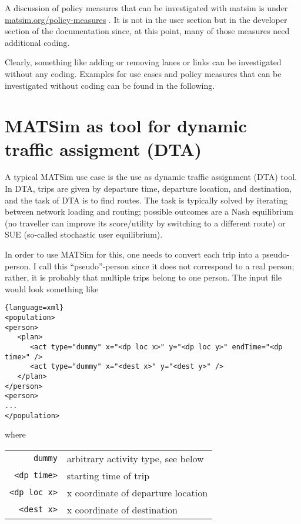 
A discussion of policy measures that can be investigated with matsim is under \href{http://matsim.org/policy-measures}{matsim.org/policy-measures}  . It is not in the user section but in the developer section of  the documentation since, at this point, many of those measures need additional coding. 

Clearly, something like adding or removing lanes or  links can be investigated without any coding.  Examples for use cases and policy measures that can be investigated without coding can be found in the following.

\section{MATSim as tool for dynamic traffic assigment (DTA)}


A typical MATSim use case is the use as dynamic traffic assignment (DTA) tool.  In DTA, trips are given by departure time, departure location, and destination, and the task of DTA is to find routes.  The task is typically solved by iterating between network loading and routing; possible outcomes are a Nash equilibrium (no traveller can improve its score/utility by switching to a different route) or SUE (so-called stochastic user equilibrium).

In order to use MATSim for this, one needs to convert each trip into a pseudo-person.  I call this ``pseudo''-person since it does not correspond to a real person; rather, it is probably that multiple trips belong to one person.  The input file would look something like
\begin{lstlisting}{language=xml}
<population>
<person>
   <plan>
      <act type="dummy" x="<dp loc x>" y="<dp loc y>" endTime="<dp time>" />
      <act type="dummy" x="<dest x>" y="<dest y>" />
   </plan>
</person>
<person>
...
</population>
\end{lstlisting}
where

\begin{tabularx}{\hsize}{rX}
\verb$dummy$ & arbitrary activity type, see below \\
\verb$<dp time>$ & starting time of trip \\
\verb$<dp loc x>$ & x coordinate of departure location \\
\verb$<dest x>$ & x coordinate of destination \\
\end{tabularx}

